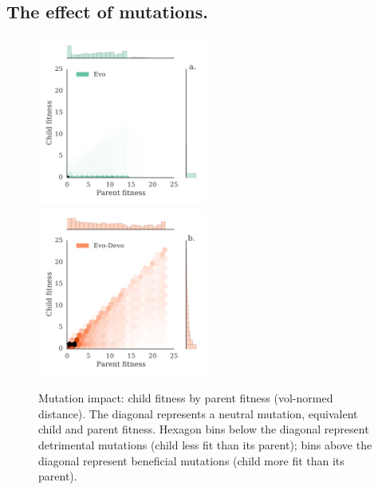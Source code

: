 \subsection*{The effect of mutations.}

\begin{figure}
\centering
\includegraphics[width=0.495\textwidth]{Chapter03/img/mutations_gecco_evo_None}
\includegraphics[width=0.495\textwidth]{Chapter03/img/mutations_gecco_devo_None}
\caption{\label{fig:mutations} Mutation impact: child fitness by parent fitness (vol-normed distance). The diagonal represents a neutral mutation, equivalent child and parent fitness. Hexagon bins below the diagonal represent detrimental mutations (child less fit than its parent); bins above the diagonal represent beneficial mutations (child more fit than its parent).}
\end{figure}


